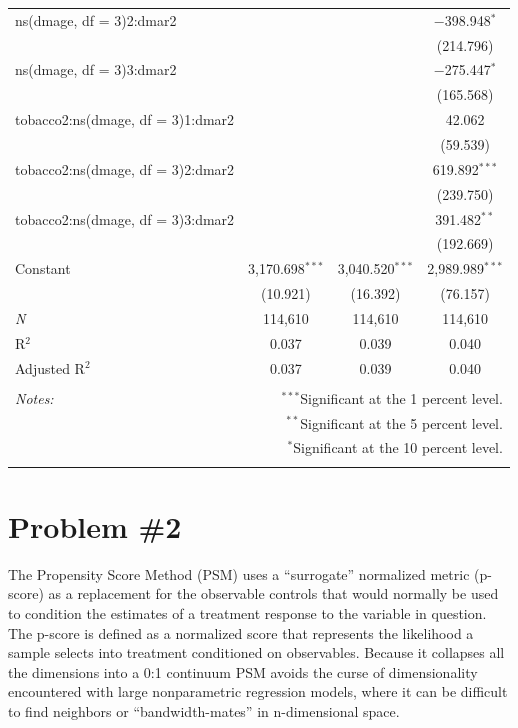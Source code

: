 \documentclass[letterpaper, 12pt]{article}
\begin{document}
\begin{table}[!htbp]
\begin{tabular}{@{\extracolsep{5pt}}lccc}
  ns(dmage, df = 3)2:dmar2 &  &  & $-$398.948$^{*}$ \\ 
  &  &  & (214.796) \\ 
  ns(dmage, df = 3)3:dmar2 &  &  & $-$275.447$^{*}$ \\ 
  &  &  & (165.568) \\ 
  tobacco2:ns(dmage, df = 3)1:dmar2 &  &  & 42.062 \\ 
  &  &  & (59.539) \\ 
  tobacco2:ns(dmage, df = 3)2:dmar2 &  &  & 619.892$^{***}$ \\ 
  &  &  & (239.750) \\ 
  tobacco2:ns(dmage, df = 3)3:dmar2 &  &  & 391.482$^{**}$ \\ 
  &  &  & (192.669) \\ 
  Constant & 3,170.698$^{***}$ & 3,040.520$^{***}$ & 2,989.989$^{***}$ \\ 
  & (10.921) & (16.392) & (76.157) \\ 
 \textit{N} & 114,610 & 114,610 & 114,610 \\ 
R$^{2}$ & 0.037 & 0.039 & 0.040 \\ 
Adjusted R$^{2}$ & 0.037 & 0.039 & 0.040 \\ 
\hline 
\hline \\[-1.8ex] 
\textit{Notes:} & \multicolumn{3}{r}{$^{***}$Significant at the 1 percent level.} \\ 
 & \multicolumn{3}{r}{$^{**}$Significant at the 5 percent level.} \\ 
 & \multicolumn{3}{r}{$^{*}$Significant at the 10 percent level.} \\ 
\normalsize 
\end{tabular} 
\end{table} 


\section{Problem \#2}

The Propensity Score Method (PSM) uses a ``surrogate'' normalized metric (p-score) as a replacement for the observable controls that would normally be used to condition the estimates of a treatment response to the variable in question.  The p-score is defined as a normalized score that represents the likelihood a sample selects into treatment conditioned on observables.  Because it collapses all the dimensions into a 0:1 continuum PSM avoids the curse of dimensionality encountered with large nonparametric regression models, where it can be difficult to find neighbors or ``bandwidth-mates'' in n-dimensional space.  
\end{document}
